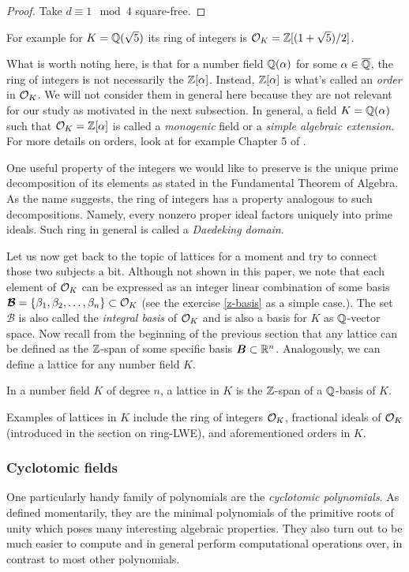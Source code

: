 \begin{proof}
	Take $d \equiv 1 \mod 4$ square-free.
\end{proof}
For example for $K = \mathbb{Q}(\sqrt{5})$ its ring of integers is $\mathcal{O}_K = \mathbb{Z}[(1 + \sqrt{5})/2]$. 
\begin{remark}\label{monogenic}
	What is worth noting here, is that for a number field $\mathbb{Q}(\alpha)$ for some $\alpha \in \overline{\mathbb{Q}}$, the ring of integers is not necessarily the $\mathbb{Z}[\alpha]$. Instead, $\mathbb{Z}[\alpha]$ is what's called an \textit{order} in $\mathcal{O}_K$. We will not consider them in general here because they are not relevant for our study as motivated in the next subsection. In general, a field $K = \mathbb{Q}(\alpha)$ such that $\mathcal{O}_K = \mathbb{Z}[\alpha]$ is called a \textit{monogenic} field or a \textit{simple algebraic extension}. For more details on orders, look at for example Chapter 5 of \cite{stein}.
\end{remark}

One useful property of the integers we would like to preserve is the unique prime decomposition of its elements as stated in the Fundamental Theorem of Algebra. As the name suggests, the ring of integers has a property analogous to such decompositions. Namely, every nonzero proper ideal factors uniquely into prime ideals. Such ring in general is called a \textit{Daedeking domain}.

Let us now get back to the topic of lattices for a moment and try to connect those two subjects a bit. Although not shown in this paper, we note that each element of $\mathcal{O}_K$ can be expressed as an integer linear combination of some basis $\boldsymbol{\mathcal{B}} = \{\beta_1, \beta_2, \ldots, \beta_n \} \subset \mathcal{O}_K$ (see the exercise \ref{z-basis} as a simple case.). The set $\bm{\mathcal{B}}$ is also called the \textit{integral basis} of $\mathcal{O}_K$ and is also a basis for $K$ as $\mathbb{Q}$-vector space. Now recall from the beginning of the previous section that any lattice can be defined as the $\mathbb{Z}$-span of some specific basis $\boldsymbol{B} \subset \mathbb{R}^n$. Analogously, we can define a lattice for any number field $K$.
\begin{definition}
	In a number field $K$ of degree $n$, a lattice in $K$ is the $\mathbb{Z}$-span of a $\mathbb{Q}$-basis of $K$.
\end{definition}
Examples of lattices in $K$ include the ring of integers $\mathcal{O}_K$, fractional ideals of $\mathcal{O}_K$ (introduced in the section on ring-LWE), and aforementioned orders in $K$.

\subsubsection*{Cyclotomic fields}
One particularly handy family of polynomials are the \textit{cyclotomic polynomials}. As defined momentarily, they are the minimal polynomials of the primitive roots of unity which poses many interesting algebraic properties. They also turn out to be much easier to compute and in general perform computational operations over, in contrast to most other polynomials.

